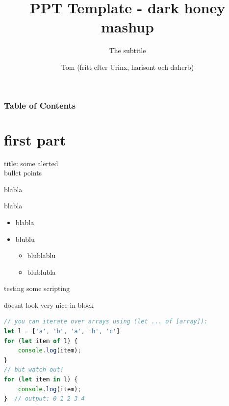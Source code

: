 \documentclass[notheorems, aspectratio=54, 14pt]{beamer}
\title[dark honey mashup Theme]{PPT Template - dark honey mashup}
\subtitle{The subtitle}
\author{Tom (fritt efter Urinx, harisont och daherb)}
\institute[GU Språkbanken Text]{tom.sodahl.bladsjo@svenska.gu.se}
\begin{document}

\frame[plain]{\titlepage}

\begin{frame}[noframenumbering]
\frametitle{Table of Contents}
\tableofcontents[subsectionstyle=hide, subsubsectionstyle=hide]
    
\end{frame}




\section{first part}

\begin{frame}{title: some alerted\\ bullet points}

blabla

blabla


\begin{itemize}[<alert@+|+->]
    \item blabla
    \item blublu
    \begin{itemize}
        \item blublablu
        \item[2.2] blublubla
    \end{itemize}
\end{itemize}
    
\end{frame}

\begin{frame}[fragile]{testing some scripting}

\begin{block}{doesnt look very nice in block}
    \begin{lstlisting}[language=JavaScript]
// you can iterate over arrays using (let ... of [array]):
let l = ['a', 'b', 'a', 'b', 'c']
for (let item of l) {
    console.log(item);
}
// but watch out!
for (let item in l) {
    console.log(item);
}  // output: 0 1 2 3 4 
\end{lstlisting}
\end{block}
    
\end{frame}
\end{document}
